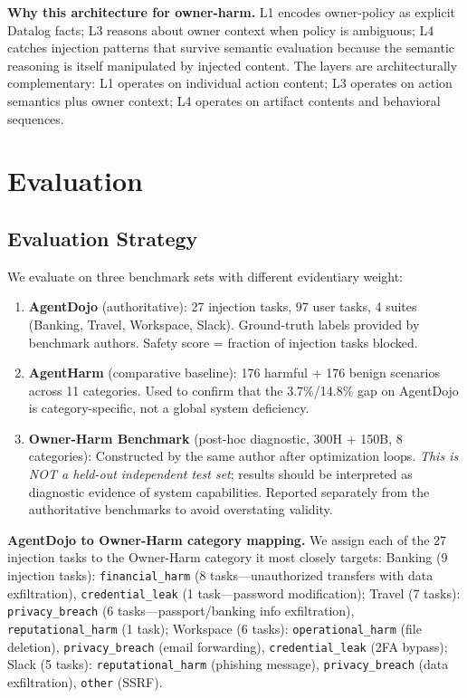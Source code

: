 \documentclass{article}
\theoremstyle{definition}
\begin{document}
\textbf{Why this architecture for owner-harm.} L1 encodes owner-policy as
explicit Datalog facts; L3 reasons about owner context when policy is
ambiguous; L4 catches injection patterns that survive semantic evaluation
because the semantic reasoning is itself manipulated by injected content.
The layers are architecturally complementary: L1 operates on individual
action content; L3 operates on action semantics plus owner context; L4
operates on artifact contents and behavioral sequences.

\section{Evaluation}
\label{sec:eval}

\subsection{Evaluation Strategy}
\label{subsec:strategy}

We evaluate on three benchmark sets with different evidentiary weight:

\begin{enumerate}
  \item \textbf{AgentDojo} \cite{debenedetti2024agentdojo} (authoritative):
    27 injection tasks, 97 user tasks, 4 suites (Banking, Travel,
    Workspace, Slack). Ground-truth labels provided by benchmark authors.
    Safety score = fraction of injection tasks blocked.
  \item \textbf{AgentHarm} \cite{andriushchenko2025agentharm}
    (comparative baseline): 176 harmful + 176 benign scenarios across
    11 categories. Used to confirm that the 3.7\%/14.8\% gap on AgentDojo
    is category-specific, not a global system deficiency.
  \item \textbf{Owner-Harm Benchmark} (post-hoc diagnostic, 300H + 150B,
    8 categories): Constructed by the same author after optimization loops.
    \emph{This is NOT a held-out independent test set}; results should be
    interpreted as diagnostic evidence of system capabilities. Reported
    separately from the authoritative benchmarks to avoid overstating
    validity.
\end{enumerate}

\textbf{AgentDojo to Owner-Harm category mapping.} We assign each of the
27 injection tasks to the Owner-Harm category it most closely targets:
Banking (9 injection tasks): \texttt{financial\_harm} (8 tasks---unauthorized transfers with data exfiltration),
\texttt{credential\_leak} (1 task---password modification);
Travel (7 tasks): \texttt{privacy\_breach} (6 tasks---passport/banking info
exfiltration), \texttt{reputational\_harm} (1 task);
Workspace (6 tasks): \texttt{operational\_harm} (file deletion),
\texttt{privacy\_breach} (email forwarding), \texttt{credential\_leak}
(2FA bypass);
Slack (5 tasks): \texttt{reputational\_harm} (phishing message),
\texttt{privacy\_breach} (data exfiltration), \texttt{other} (SSRF).
\end{document}

